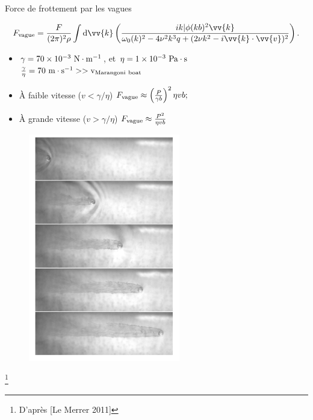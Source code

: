 \documentclass[aspectratio=169,10pt]{beamer}
\begin{document}
\begin{frame}{Force de frottement par les vagues}
    \begin{minipage}{10cm}
            \begin{equation}
                F_{\rm vague} = \frac{F}{(2\pi)^2\rho}\int\mathrm{d}\vv{k}\left(\frac{ik|\phi(kb)^2\vv{k}}{\omega_0(k)^2-4\nu^2k^3q+(2\nu k^2-i\vv{k}\cdot\vv{v})^2}\right).
            \end{equation}
            \begin{itemize}
              \item $\gamma = 70\times 10^{-3}~\rm N\cdot m^{-1}$, et  $\eta = 1\times 10^{-3}~\rm Pa\cdot s$
                 $\frac{\gamma}{\eta} = 70~\rm m\cdot s^{-1}>> v_{\rm Marangoni~boat}$
                \item À faible vitesse ($v<\gamma/\eta$) 
                $F_{\rm vague}\approx\left(\frac{P}{\gamma b}\right)^{2}\eta v b;$ \checkmark
                \item À grande vitesse ($v>\gamma/\eta$) $F_{\rm vague}\approx \frac{P^2}{\eta v b}$
                \end{itemize}
    \end{minipage}
    \begin{minipage}{3cm}
            \begin{figure}
              \includegraphics[scale=1]{./figures/Lemerrer.pdf}
            \end{figure}
    \end{minipage}

    \footnote{D'après [Le Merrer 2011]}
\end{frame}
\end{document}
